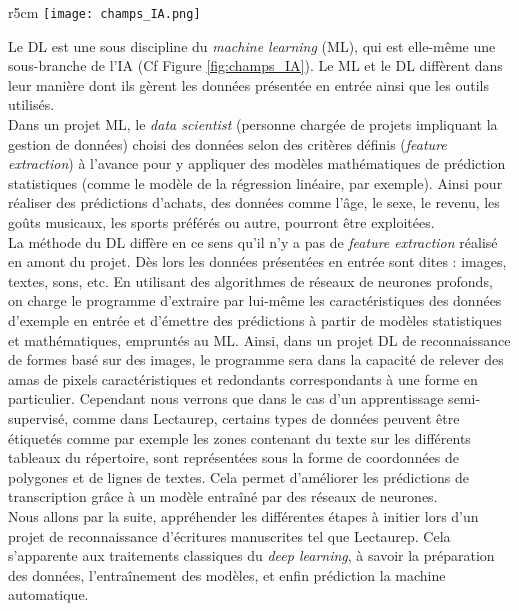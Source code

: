 \begin{wrapfigure}[13]{r}{5cm}
    \centering
    \texttt{[image: champs\_IA.png]}
    \caption{Les différentes disciplines de l'IA \textcopyright L. Terriel, 2020, Diagrams.net}
    \label{fig:champs_IA}
\end{wrapfigure}
Le DL est une sous discipline du \textit{machine learning} (ML), qui est elle-même une sous-branche de l'IA (Cf Figure \ref{fig:champs_IA}). Le ML et le DL diffèrent dans leur manière dont ils gèrent les données présentée en entrée ainsi que les outils utilisés.\\

Dans un projet ML, le \textit{data scientist} (personne chargée de projets impliquant la gestion de données) choisi des données selon des critères définis (\textit{feature extraction}) à l'avance pour y appliquer des modèles mathématiques de prédiction statistiques (comme le modèle de la régression linéaire, par exemple). Ainsi pour réaliser des prédictions d'achats, des données comme l'âge, le sexe, le revenu, les goûts musicaux, les sports préférés ou autre, pourront être exploitées.\\

La méthode du DL diffère en ce sens qu'il n'y a pas de \textit{feature extraction} réalisé en amont du projet. Dès lors les données présentées en entrée sont dites  : images, textes, sons, etc. En utilisant des algorithmes de réseaux de neurones profonds, on charge le programme d'extraire par lui-même les caractéristiques des données d'exemple en entrée et d'émettre des prédictions à partir de modèles statistiques et mathématiques, empruntés au ML. Ainsi, dans un projet DL de reconnaissance de formes basé sur des images, le programme sera dans la capacité de relever des amas de pixels caractéristiques et redondants correspondants à une forme en particulier. Cependant nous verrons que dans le cas d'un apprentissage semi-supervisé, comme dans Lectaurep, certains types de données peuvent être étiquetés comme par exemple les zones contenant du texte sur les différents tableaux du répertoire, sont représentées sous la forme de coordonnées de polygones et de lignes de textes. Cela permet d'améliorer les prédictions de transcription grâce à un modèle entraîné par des réseaux de neurones.\\ 

Nous allons par la suite, appréhender les différentes étapes à initier lors d'un projet de reconnaissance d'écritures manuscrites tel que Lectaurep. Cela s'apparente aux traitements classiques du \textit{deep learning}, à savoir la préparation des données, l'entraînement des modèles, et enfin prédiction la machine automatique.

